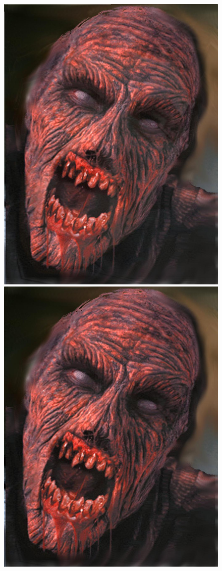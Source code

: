 \documentclass[11pt]{article}
\begin{document}
\begin{figure}[H]
\begin{center}
\includegraphics[scale=0.08]{figs/zombie/zombie_bf_19.jpg} 
\includegraphics[scale=0.08]{figs/zombie/zombie_bf_20.jpg} 

\end{center}
\end{figure}
\end{document}
